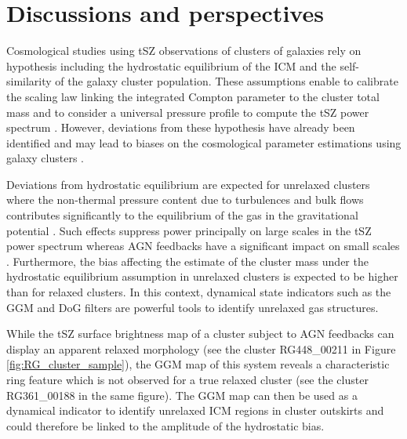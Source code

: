 \documentclass[twocolumn,traditabstract]{aa}
\begin{document}
\section{Discussions and perspectives}\label{sec:discussions}
Cosmological studies using tSZ observations of clusters of galaxies rely on hypothesis including the hydrostatic equilibrium of the ICM and the self-similarity of the galaxy cluster population. These assumptions enable to calibrate the scaling law linking the integrated Compton parameter to the cluster total mass \citep[see, e.g,][]{Arnaud2007} and to consider a universal pressure profile to compute the tSZ power spectrum \citep[e.g.][]{Komatsu2002}. However, deviations from these hypothesis have already been identified and may lead to biases on the cosmological parameter estimations using galaxy clusters \citep[see, e.g.][]{Ichikawa2013,McDonald2014}.

Deviations from hydrostatic equilibrium are expected for unrelaxed clusters where the non-thermal pressure content due to turbulences and bulk flows contributes significantly to the equilibrium of the gas in the gravitational potential \citep[e.g.][]{Siegel2016}. Such effects suppress power principally on large scales in the tSZ power spectrum whereas AGN feedbacks have a significant impact on small scales \citep[e.g.][]{Shaw2010}. Furthermore, the bias affecting the estimate of the cluster mass under the hydrostatic equilibrium assumption in unrelaxed clusters is expected to be higher than for relaxed clusters. In this context, dynamical state indicators such as the GGM and DoG filters are powerful tools to identify unrelaxed gas structures.

While the tSZ surface brightness map of a cluster subject to AGN feedbacks can display an apparent relaxed morphology (see the cluster RG448\_00211 in Figure \ref{fig:RG_cluster_sample}), the GGM map of this system reveals a characteristic ring feature which is not observed for a true relaxed cluster (see the cluster RG361\_00188 in the same figure). The GGM map can then be used as a dynamical indicator to identify unrelaxed ICM regions in cluster outskirts and could therefore be linked to the amplitude of the hydrostatic bias.
\end{document}
